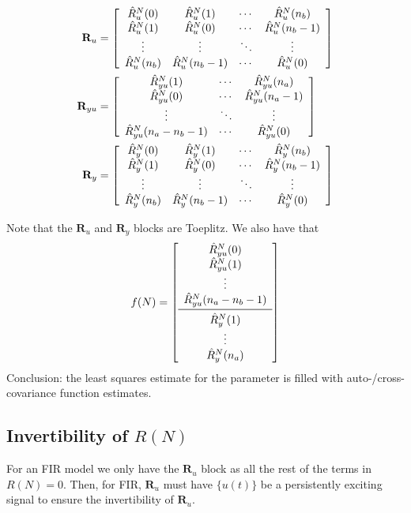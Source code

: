 \begin{align*}
\mathbf{R}_u &= \left[\begin{array}{c c c c}
\hat{R}_u^N(0) & \hat{R}_u^N(1) & \cdots & \hat{R}_u^N(n_b) \\
\hat{R}_u^N(1) & \hat{R}_u^N(0) & \cdots & \hat{R}_u^N(n_b-1) \\
\vdots & \vdots & \ddots & \vdots \\
\hat{R}_u^N(n_b) & \hat{R}_u^N(n_b-1) & \cdots & \hat{R}_u^N(0)
\end{array}\right] \\
\mathbf{R}_{yu} &= \left[\begin{array}{c c c}
\hat{R}_{yu}^N(1) & \cdots & \hat{R}_{yu}^N(n_a) \\
\hat{R}_{yu}^N(0) & \cdots & \hat{R}_{yu}^N(n_a-1) \\
\vdots & \ddots & \vdots \\
\hat{R}_{yu}^N(n_a-n_b-1) & \cdots & \hat{R}_{yu}^N(0)
\end{array}\right] \\
\mathbf{R}_y &= \left[\begin{array}{c c c c}
\hat{R}_y^N(0) & \hat{R}_y^N(1) & \cdots & \hat{R}_y^N(n_b) \\
\hat{R}_y^N(1) & \hat{R}_y^N(0) & \cdots & \hat{R}_y^N(n_b-1) \\
\vdots & \vdots & \ddots & \vdots \\
\hat{R}_y^N(n_b) & \hat{R}_y^N(n_b-1) & \cdots & \hat{R}_y^N(0)
\end{array}\right]
\end{align*}

Note that the $\mathbf{R}_u$ and $\mathbf{R}_y$ blocks are Toeplitz.
We also have that
\begin{align*}
f(N) = \left[\begin{array}{c}
\hat{R}_{yu}^N(0) \\
\hat{R}_{yu}^N(1) \\
\vdots \\
\hat{R}_{yu}^N(n_a-n_b-1) \\
\midrule
\hat{R}_y^N(1) \\
\vdots \\
\hat{R}_y^N(n_a) \end{array}\right]
\end{align*}
Conclusion: the least squares estimate for the parameter is filled with auto-/cross-covariance function estimates.

\subsection{Invertibility of $R(N)$}
\label{sec:upersistent}
For an FIR model we only have the $\mathbf{R}_u$ block as all the rest of the terms in $R(N)=0$.
Then, for FIR, $\mathbf{R}_u$ must have $\{u(t)\}$ be a persistently exciting signal to ensure the invertibility of $\mathbf{R}_u$.

